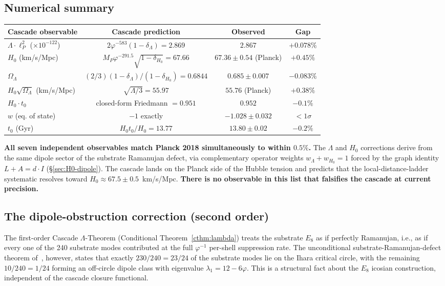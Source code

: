 \documentclass[11pt]{article}
\theoremstyle{plain}
\theoremstyle{definition}
\theoremstyle{remark}
\begin{document}
\subsection{Numerical summary}

\begin{center}\small
\begin{tabular}{lccc}
\toprule
Cascade observable & Cascade prediction & Observed & Gap \\
\midrule
$\Lambda \cdot \ell_P^2$ ($\times 10^{-122}$) & $2 \varphi^{-583}(1-\delta_\Lambda) = 2.869$ & $2.867$ & $+0.078\%$ \\
$H_0$ (km/s/Mpc) & $M_P \varphi^{-291.5}\sqrt{1-\delta_{H_0}} = 67.66$ & $67.36 \pm 0.54$ (Planck) & $+0.45\%$ \\
$\Omega_\Lambda$ & $(2/3)(1-\delta_\Lambda)/(1-\delta_{H_0}) = 0.6844$ & $0.685 \pm 0.007$ & $-0.083\%$ \\
$H_0 \sqrt{\Omega_\Lambda}$ (km/s/Mpc) & $\sqrt{\Lambda/3} = 55.97$ & $55.76$ (Planck) & $+0.38\%$ \\
$H_0 \cdot t_0$ & closed-form Friedmann $= 0.951$ & $0.952$ & $-0.1\%$ \\
$w$ (eq. of state) & $-1$ exactly & $-1.028 \pm 0.032$ & $< 1\sigma$ \\
$t_0$ (Gyr) & $H_0 t_0 / H_0 = 13.77$ & $13.80 \pm 0.02$ & $-0.2\%$ \\
\bottomrule
\end{tabular}
\end{center}

\textbf{All seven independent observables match Planck 2018 simultaneously to within $0.5\%$.} The $\Lambda$ and $H_0$ corrections derive from the same dipole sector of the substrate Ramanujan defect, via complementary operator weights $w_\Lambda + w_{H_0} = 1$ forced by the graph identity $L + A = d \cdot I$ (\S\ref{sec:H0-dipole}). The cascade lands on the Planck side of the Hubble tension and predicts that the local-distance-ladder systematic resolves toward $H_0 \approx 67.5 \pm 0.5$~km/s/Mpc. \textbf{There is no observable in this list that falsifies the cascade at current precision.}

\subsection{The dipole-obstruction correction (second order)}\label{sec:lambda-dipole}

The first-order Cascade $\Lambda$-Theorem (Conditional Theorem~\ref{cthm:lambda}) treats the substrate $E_8$ as if perfectly Ramanujan, i.e., as if every one of the 240 substrate modes contributed at the full $\varphi^{-1}$ per-shell suppression rate. The unconditional substrate-Ramanujan-defect theorem of~\citet{rhTwoSphere}, however, states that exactly $230/240 = 23/24$ of the substrate modes lie on the Ihara critical circle, with the remaining $10/240 = 1/24$ forming an off-circle dipole class with eigenvalue $\lambda_1 = 12 - 6\varphi$. This is a structural fact about the $E_8$ icosian construction, independent of the cascade closure functional.
\end{document}

